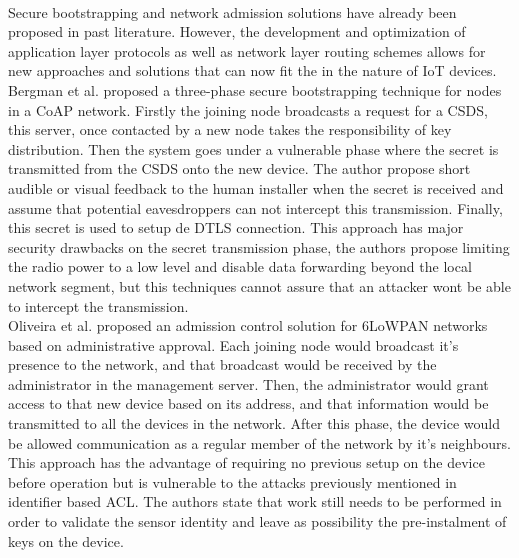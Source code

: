 \paragraph{}
Secure bootstrapping and network admission solutions have already been proposed in past literature. However, the development and optimization of application layer protocols as well as network layer routing schemes allows for new approaches and solutions that can now fit the in the nature of \ac{IoT} devices.
Bergman et al. \cite{Bergmann2012} proposed a three-phase secure bootstrapping technique for nodes in a \ac{CoAP} network. Firstly the joining node broadcasts a request for a \ac{CSDS}, this server, once contacted by a new node takes the responsibility of key distribution. Then the system goes under a vulnerable phase where the secret is transmitted from the \ac{CSDS} onto the new device. The author propose short audible or visual feedback to the human installer when the secret is received and assume that potential eavesdroppers can not intercept this transmission. Finally, this secret is used to setup de \ac{DTLS} connection. This approach has major security drawbacks on the secret transmission phase, the authors propose limiting the radio power to a low level and disable data forwarding beyond the local network segment, but this techniques cannot assure that an attacker wont be able to intercept the transmission.\\
Oliveira et al. \cite{Oliveira2013} proposed an admission control solution for 6LoWPAN networks based on administrative approval. Each joining node would broadcast it's presence to the network, and that broadcast would be received by the administrator in the management server. Then, the administrator would grant access to that new device based on its address, and that information would be transmitted to all the devices in the network. After this phase, the device would be allowed communication as a regular member of the network by it's neighbours. This approach has the advantage of requiring no previous setup on the device before operation but is vulnerable to the attacks previously mentioned in identifier based \ac{ACL}. The authors state that work still needs to be performed in order to validate the sensor identity and leave as possibility the pre-instalment of keys on the device. 